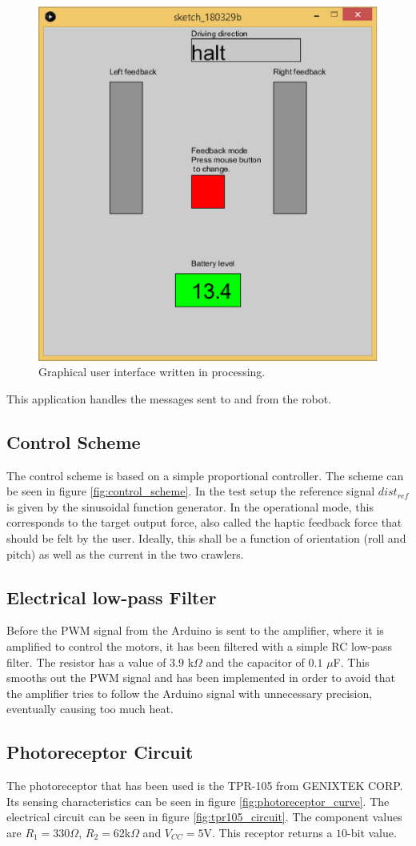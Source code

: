 	\begin{figure}[h!]
		\centering
		\includegraphics[width=0.4\linewidth]{Figs/processing_gui}
		\caption{Graphical user interface written in processing.}
		\label{fig:processing_gui}
	\end{figure}

	This application handles the messages sent to and from the robot.
	
	\subsection{Control Scheme}
	The control scheme is based on a simple proportional controller. The scheme can be seen in figure \ref{fig:control_scheme}. In the test setup the reference signal $dist_{ref}$ is given by the sinusoidal function generator. In the operational mode, this corresponds to the target output force, also called the haptic feedback force that should be felt by the user. Ideally, this shall be a function of orientation (roll and pitch) as well as the current in the two crawlers.
	
	\subsection{Electrical low-pass Filter}
	Before the PWM signal from the Arduino is sent to the amplifier, where it is amplified to control the motors, it has been filtered with a simple RC low-pass filter. The resistor has a value of $3.9$ k$\Omega$ and the capacitor of $0.1$ $\mu$F. This smooths out the PWM signal and has been implemented in order to avoid that the amplifier tries to follow the Arduino signal with unnecessary precision, eventually causing too much heat.
	
	
	\subsection{Photoreceptor Circuit}
	The photoreceptor that has been used is the TPR-105 from GENIXTEK CORP. Its sensing characteristics can be seen in figure \ref{fig:photoreceptor_curve}. The electrical circuit can be seen in figure \ref{fig:tpr105_circuit}. The component values are $R_1 = 330 \Omega$, $R_2 = 62$k$\Omega$ and $V_{CC} = 5$V. This receptor returns a $10$-bit value.
	
